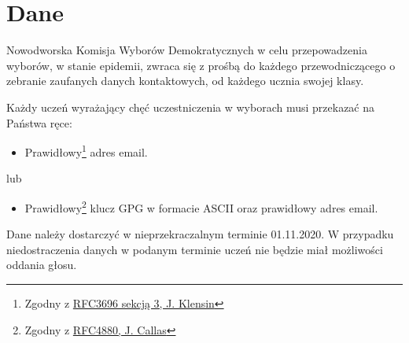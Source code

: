 \section{Dane}


Nowodworska Komisja Wyborów Demokratycznych w celu przepowadzenia wyborów, w stanie epidemii, zwraca się z prośbą do każdego przewodniczącego o zebranie zaufanych danych kontaktowych, od każdego ucznia swojej klasy. \\

\par Każdy uczeń wyrażający chęć uczestniczenia w wyborach musi przekazać na Państwa ręce:

\begin{itemize}
  \item Prawidłowy\footnote{Zgodny z \href{https://tools.ietf.org/html/rfc3696}{RFC3696 sekcją 3, J. Klensin}} adres email.
\end{itemize}

\vspace{-0.3cm}
\hspace{1cm} lub
\vspace{-0.3cm}

\begin{itemize}
  \item Prawidłowy\footnote{Zgodny z \href{https://tools.ietf.org/html/rfc4880}{RFC4880, J. Callas}} klucz GPG w formacie ASCII oraz prawidłowy adres email.
\end{itemize}
\vspace{0.3cm} %
Dane należy dostarczyć w nieprzekraczalnym terminie 01.11.2020. W przypadku niedostraczenia danych w podanym terminie uczeń nie będzie miał możliwości oddania głosu.

